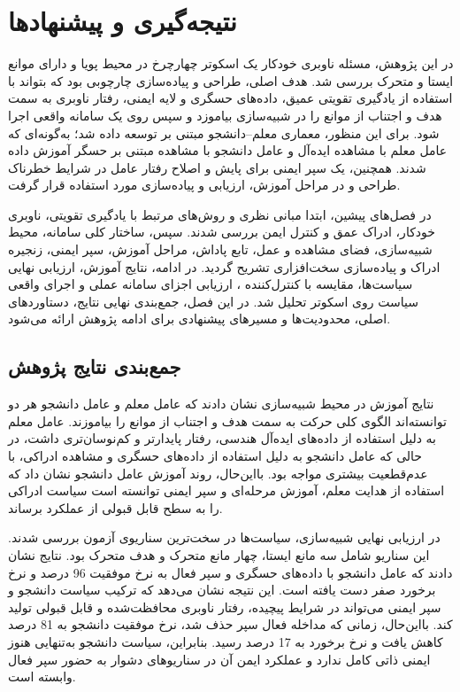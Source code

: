 \chapter{نتیجه‌گیری و پیشنهادها}
\label{chap:conclusion}

در این پژوهش، مسئله ناوبری خودکار یک اسکوتر چهارچرخ در محیط پویا و دارای موانع ایستا و متحرک بررسی شد. هدف اصلی، طراحی و پیاده‌سازی چارچوبی بود که بتواند با استفاده از یادگیری تقویتی عمیق، داده‌های حسگری و لایه ایمنی، رفتار ناوبری به سمت هدف و اجتناب از موانع را در شبیه‌سازی بیاموزد و سپس روی یک سامانه واقعی اجرا شود. برای این منظور، معماری معلم--دانشجو مبتنی بر  توسعه داده شد؛ به‌گونه‌ای که عامل معلم با مشاهده ایده‌آل و عامل دانشجو با مشاهده مبتنی بر حسگر آموزش داده شدند. همچنین، یک سپر ایمنی برای پایش و اصلاح رفتار عامل در شرایط خطرناک طراحی و در مراحل آموزش، ارزیابی و پیاده‌سازی مورد استفاده قرار گرفت.

در فصل‌های پیشین، ابتدا مبانی نظری و روش‌های مرتبط با یادگیری تقویتی، ناوبری خودکار، ادراک عمق و کنترل ایمن بررسی شدند. سپس، ساختار کلی سامانه، محیط شبیه‌سازی، فضای مشاهده و عمل، تابع پاداش، مراحل آموزش، سپر ایمنی، زنجیره ادراک و پیاده‌سازی سخت‌افزاری تشریح گردید. در ادامه، نتایج آموزش، ارزیابی نهایی سیاست‌ها، مقایسه با کنترل‌کننده ، ارزیابی اجزای سامانه عملی و اجرای واقعی سیاست روی اسکوتر تحلیل شد. در این فصل، جمع‌بندی نهایی نتایج، دستاوردهای اصلی، محدودیت‌ها و مسیرهای پیشنهادی برای ادامه پژوهش ارائه می‌شود.

\section{جمع‌بندی نتایج پژوهش}
\label{sec:final_results_summary}

نتایج آموزش در محیط شبیه‌سازی نشان دادند که عامل معلم و عامل دانشجو هر دو توانسته‌اند الگوی کلی حرکت به سمت هدف و اجتناب از موانع را بیاموزند. عامل معلم به دلیل استفاده از داده‌های ایده‌آل هندسی، رفتار پایدارتر و کم‌نوسان‌تری داشت، در حالی که عامل دانشجو به دلیل استفاده از داده‌های حسگری و مشاهده ادراکی، با عدم‌قطعیت بیشتری مواجه بود. بااین‌حال، روند آموزش عامل دانشجو نشان داد که استفاده از هدایت معلم، آموزش مرحله‌ای و سپر ایمنی توانسته است سیاست ادراکی را به سطح قابل قبولی از عملکرد برساند.

در ارزیابی نهایی شبیه‌سازی، سیاست‌ها در سخت‌ترین سناریوی آزمون بررسی شدند. این سناریو شامل سه مانع ایستا، چهار مانع متحرک و هدف متحرک بود. نتایج نشان دادند که عامل دانشجو با داده‌های حسگری و سپر فعال به نرخ موفقیت 96 درصد و نرخ برخورد صفر دست یافته است. این نتیجه نشان می‌دهد که ترکیب سیاست دانشجو و سپر ایمنی می‌تواند در شرایط پیچیده، رفتار ناوبری محافظت‌شده و قابل قبولی تولید کند. بااین‌حال، زمانی که مداخله فعال سپر حذف شد، نرخ موفقیت دانشجو به 81 درصد کاهش یافت و نرخ برخورد به 17 درصد رسید. بنابراین، سیاست دانشجو به‌تنهایی هنوز ایمنی ذاتی کامل ندارد و عملکرد ایمن آن در سناریوهای دشوار به حضور سپر فعال وابسته است.

